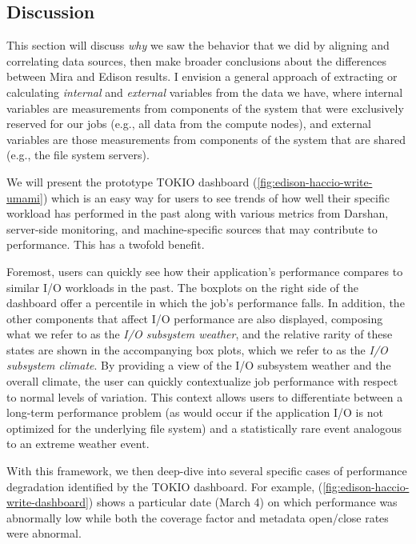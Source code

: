 \documentclass[conference,10pt,compsocconf]{IEEEtran}
\begin{document}
\subsection{Discussion} \label{sec:results/discussion}

This section will discuss \emph{why} we saw the behavior that we did by
aligning and correlating data sources, then make broader conclusions about the
differences
between Mira and Edison results.  I envision a general approach of extracting
or calculating \emph{internal} and \emph{external} variables from the data we
have, where internal variables are measurements from components of the system
that were exclusively reserved for our jobs (e.g., all data from the compute
nodes), and external variables are those measurements from components of the
system that are shared (e.g., the file system servers).

We will present the prototype TOKIO dashboard (\ref{fig:edison-haccio-write-umami})
which is an easy way for users to see trends of how well their specific
workload has performed in the past along with various metrics from Darshan,
server-side monitoring, and machine-specific sources that may contribute to
performance.  This has a twofold benefit.

Foremost, users can quickly see how their application's performance compares
to similar I/O workloads in the past.  The boxplots on the right side of the
dashboard offer a percentile in which the job's performance falls.  In addition,
the other components that affect I/O performance are also displayed, composing
what we refer to as the \emph{I/O subsystem weather}, and the relative rarity
of these states are shown in the accompanying box plots, which we refer to as
the \emph{I/O subsystem climate}.  By providing a view of the I/O subsystem
weather and the overall climate, the user can quickly contextualize job
performance with respect to normal levels of variation.  This context allows
users to differentiate between a long-term performance problem (as would occur
if the application I/O is not optimized for the underlying file system) and a
statistically rare event analogous to an extreme weather event.

With this framework, we then deep-dive into several specific cases of
performance degradation identified by the TOKIO dashboard.  For example,
(\ref{fig:edison-haccio-write-dashboard}) shows a particular date (March 4) on
which performance was abnormally low while both the coverage factor and metadata
open/close rates were abnormal.
\end{document}
